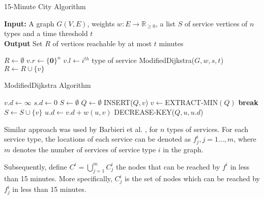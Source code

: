 \begin{algorithm}[!h]
    \caption{15-Minute City Algorithm}\label{alg:15mc}
    \textbf{Input:} A graph $G(V,E)$, weights $w:E\rightarrow\mathbb{R}_{\geq 0}$, a list $S$ of service vertices of $n$ types and a time threshold $t$\\
    \textbf{Output} Set $R$ of vertices reachable by at most $t$ minutes
    \begin{algorithmic}
        \State $R\gets\emptyset$
            \State $v.r \gets \{\mathbf{0}\}^{n}$
        \EndFor
            \State $v.l \gets i^{th}$ type of service
        \EndFor
                \State ModifiedDijkstra($G,w,s,t$)
            \EndFor
        \EndFor
                \State $R \gets R\cup \{v\}$
            \EndIf
        \EndFor
    \end{algorithmic}
\end{algorithm}

\begin{algorithm}[!h]
    \caption{ModifiedDijkstra Algorithm}\label{alg:modified_dijsktra}
    \begin{algorithmic}
            \State $v.d\gets\infty$
        \EndFor
        \State $s.d\gets 0$
        \State $S\gets\emptyset$
        \State $Q\gets\emptyset$
            \State INSERT($Q,v$)
        \EndFor
            \State $v\gets$EXTRACT-MIN$(Q)$
                \State \textbf{break}
            \EndIf
            \State $S\gets S\cup\{v\}$
                    \State $u.d\gets v.d+w(u,v)$
                    \State DECREASE-KEY($Q,u,u.d$)
                \EndIf
            \EndFor
        \EndWhile
    \end{algorithmic}
\end{algorithm}


Similar approach was used by Barbieri et al. \cite{barbieri_graph_2023}, for $n$ types of services. For each service type, the locations of each service can be denoted as $f^i_j,j=1...,m$, where $m$ denotes the number of services of service type $i$ in the graph.

Subsequently, define $C^i=\bigcup\limits_{j=1}^m C^i_j$ the nodes that can be reached by $f^i$ in less than 15 minutes. More specifically, $C^i_j$ is the set of nodes which can be reached by $f^i_j$ in less than 15 minutes.

